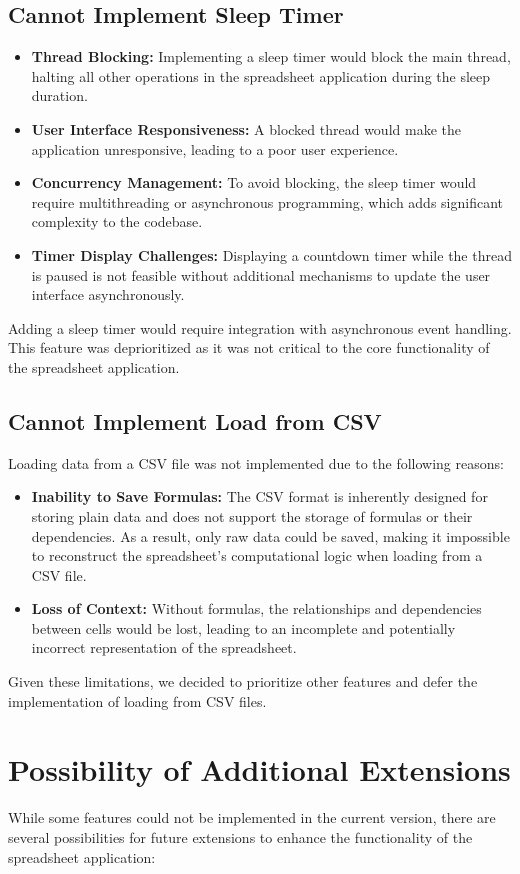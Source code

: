 \documentclass{article}
\begin{document}
\subsection{Cannot Implement Sleep Timer}
\begin{itemize}
    \item \textbf{Thread Blocking:} Implementing a sleep timer would block the main thread, halting all other operations in the spreadsheet application during the sleep duration.
    \item \textbf{User Interface Responsiveness:} A blocked thread would make the application unresponsive, leading to a poor user experience.
    \item \textbf{Concurrency Management:} To avoid blocking, the sleep timer would require multithreading or asynchronous programming, which adds significant complexity to the codebase.
    \item \textbf{Timer Display Challenges:} Displaying a countdown timer while the thread is paused is not feasible without additional mechanisms to update the user interface asynchronously.
\end{itemize}
Adding a sleep timer would require integration with asynchronous event handling. This feature was deprioritized as it was not critical to the core functionality of the spreadsheet application.

\subsection{Cannot Implement Load from CSV}
Loading data from a CSV file was not implemented due to the following reasons:
\begin{itemize}
    \item \textbf{Inability to Save Formulas:} The CSV format is inherently designed for storing plain data and does not support the storage of formulas or their dependencies. As a result, only raw data could be saved, making it impossible to reconstruct the spreadsheet's computational logic when loading from a CSV file.
    \item \textbf{Loss of Context:} Without formulas, the relationships and dependencies between cells would be lost, leading to an incomplete and potentially incorrect representation of the spreadsheet.
\end{itemize}
Given these limitations, we decided to prioritize other features and defer the implementation of loading from CSV files.

\section{Possibility of Additional Extensions}
While some features could not be implemented in the current version, there are several possibilities for future extensions to enhance the functionality of the spreadsheet application:
\end{document}

